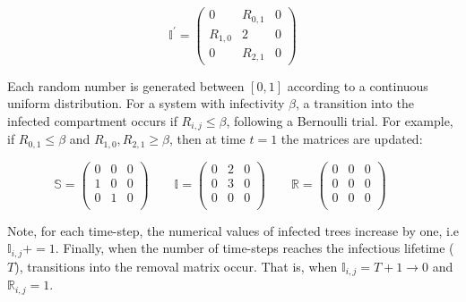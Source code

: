 \begin{equation}
    \mathbb{I}^{'} = \begin{pmatrix}
        0 & R_{0,1} & 0 \\
        R_{1,0} & 2 & 0 \\
        0 & R_{2,1} & 0 
     \end{pmatrix}
\end{equation}

Each random number is generated between $[0, 1]$ according to a continuous uniform distribution. 
For a system with infectivity $\beta$, a transition into the infected compartment occurs if $R_{i,j} \leqslant \beta$, following a Bernoulli trial. 
For example, if $R_{0,1}\leqslant \beta$ and $R_{1,0}, R_{2,1} \geq \beta $, then at time $t=1$ the matrices are updated:

\begin{equation}
    \mathbb{S} = \left( \begin{array}{ccc}
    0 & 0 & 0\\
    1 & 0 & 0\\
    0& 1 & 0 \\
    \end{array} \right)\qquad
    \mathbb{I}= \left( \begin{array}{ccc}
    0 & 2 & 0\\
    0 & 3 & 0\\
    0& 0 & 0 \\
    \end{array} \right)\qquad
    \mathbb{R}= \left( \begin{array}{ccc}
    0 & 0 & 0\\
    0 & 0 & 0\\
    0 & 0 & 0\\
    \end{array} \right)\qquad
\end{equation}

Note, for each time-step, the numerical values of infected trees increase by one, i.e $\mathbb{I}_{i,j} += 1$.
Finally, when the number of time-steps reaches the infectious lifetime ($T$), transitions into the removal matrix occur.
That is, when $\mathbb{I}_{i,j}=T+1 \rightarrow 0 $ and $ \mathbb{R}_{i,j}=1$. 

